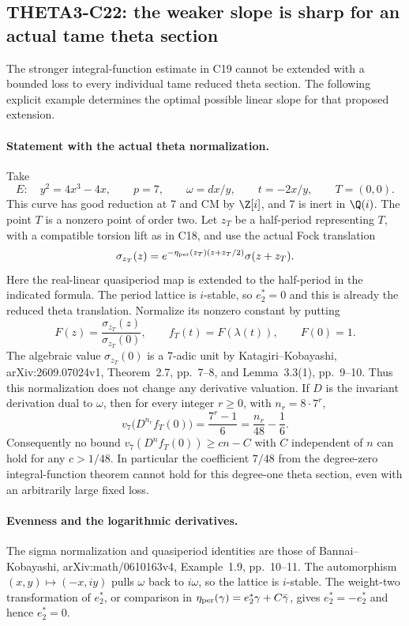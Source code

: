 \subsection{THETA3-C22: the weaker slope is sharp for an actual tame theta section}\label{C22}

The stronger integral-function estimate in C19 cannot be extended
with a bounded loss to every individual tame reduced theta section.
The following explicit example determines the optimal possible
linear slope for that proposed extension.

\paragraph{Statement with the actual theta normalization.}
Take
\[
 E:\quad y^2=4x^3-4x,\qquad p=7,\qquad
 \omega=dx/y,\qquad t=-2x/y,
 \qquad T=(0,0).
\]
This curve has good reduction at 7 and CM by $\Z[i]$, and 7 is
inert in $\Q(i)$.  The point $T$ is a nonzero point of order
two.  Let $z_T$ be a half-period representing $T$, with a
compatible torsion lift as in C18, and use the actual Fock
translation
\[
 \sigma_{z_T}(z)=
 e^{-\eta_{\rm per}(z_T)(z+z_T/2)}\sigma(z+z_T).
\]
Here the real-linear quasiperiod map is extended to the
half-period in the indicated formula.  The period lattice is
$i$-stable, so $e_2^*=0$ and this is already the reduced theta
translation.  Normalize its nonzero constant by putting
\[
 F(z)=\frac{\sigma_{z_T}(z)}{\sigma_{z_T}(0)},\qquad
 f_T(t)=F(\lambda(t)),\qquad F(0)=1.
\]
The algebraic value $\sigma_{z_T}(0)$ is a 7-adic unit by
Katagiri--Kobayashi, arXiv:2609.07024v1,
Theorem~2.7, pp.~7--8, and Lemma~3.3(1), pp.~9--10.
Thus this normalization does not change any derivative valuation.
If $D$ is the invariant derivation dual to $\omega$, then for
every integer $r\geq0$, with $n_r=8\cdot7^r$,
\begin{equation}\label{C22-exact}
 v_7\bigl(D^{n_r}f_T(0)\bigr)
      =\frac{7^r-1}{6}
      =\frac{n_r}{48}-\frac16.
\end{equation}
Consequently no bound
$v_7(D^nf_T(0))\geq c n-C$ with $C$ independent of $n$
can hold for any $c>1/48$.
In particular the coefficient $7/48$ from the degree-zero
integral-function theorem cannot hold for this degree-one
theta section, even with an arbitrarily large fixed loss.

\paragraph{Evenness and the logarithmic derivatives.}
The sigma normalization and quasiperiod identities are those of
Bannai--Kobayashi, arXiv:math/0610163v4,
Example~1.9, pp.~10--11.
The automorphism $(x,y)\mapsto(-x,iy)$ pulls $\omega$ back to
$i\omega$, so the lattice is $i$-stable.  The weight-two
transformation of $e_2^*$, or comparison in
$\eta_{\rm per}(\gamma)=e_2^*\gamma+C\bar\gamma$, gives
$e_2^*=-e_2^*$ and hence $e_2^*=0$.


